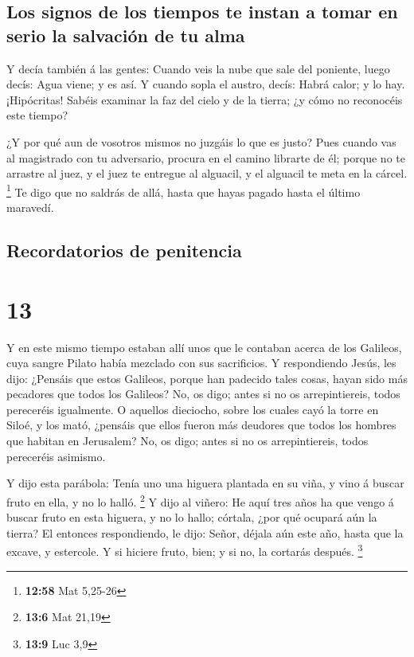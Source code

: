\hypertarget{los-signos-de-los-tiempos-te-instan-a-tomar-en-serio-la-salvaciuxf3n-de-tu-alma}{%
\subsection{Los signos de los tiempos te instan a tomar en serio la
salvación de tu
alma}\label{los-signos-de-los-tiempos-te-instan-a-tomar-en-serio-la-salvaciuxf3n-de-tu-alma}}

 Y decía también á las gentes: Cuando veis la nube que
sale del poniente, luego decís: Agua viene; y es así.  Y
cuando sopla el austro, decís: Habrá calor; y lo hay. 
¡Hipócritas! Sabéis examinar la faz del cielo y de la tierra; ¿y cómo no
reconocéis este tiempo?

 ¿Y por qué aun de vosotros mismos no juzgáis lo que es
justo?  Pues cuando vas al magistrado con tu adversario,
procura en el camino librarte de él; porque no te arrastre al juez, y el
juez te entregue al alguacil, y el alguacil te meta en la cárcel.
\footnote{\textbf{12:58} Mat 5,25-26}  Te digo que no
saldrás de allá, hasta que hayas pagado hasta el último maravedí.

\hypertarget{recordatorios-de-penitencia}{%
\subsection{Recordatorios de
penitencia}\label{recordatorios-de-penitencia}}

\hypertarget{section-12}{%
\section{13}\label{section-12}}

 Y en este mismo tiempo estaban allí unos que le contaban
acerca de los Galileos, cuya sangre Pilato había mezclado con sus
sacrificios.  Y respondiendo Jesús, les dijo: ¿Pensáis que
estos Galileos, porque han padecido tales cosas, hayan sido más
pecadores que todos los Galileos?  No, os digo; antes si
no os arrepintiereis, todos pereceréis igualmente.  O
aquellos dieciocho, sobre los cuales cayó la torre en Siloé, y los mató,
¿pensáis que ellos fueron más deudores que todos los hombres que habitan
en Jerusalem?  No, os digo; antes si no os arrepintiereis,
todos pereceréis asimismo.

 Y dijo esta parábola: Tenía uno una higuera plantada en
su viña, y vino á buscar fruto en ella, y no lo halló. \footnote{\textbf{13:6}
  Mat 21,19}  Y dijo al viñero: He aquí tres años ha que
vengo á buscar fruto en esta higuera, y no lo hallo; córtala, ¿por qué
ocupará aún la tierra?  El entonces respondiendo, le dijo:
Señor, déjala aún este año, hasta que la excave, y estercole.
 Y si hiciere fruto, bien; y si no, la cortarás después.
\footnote{\textbf{13:9} Luc 3,9}

